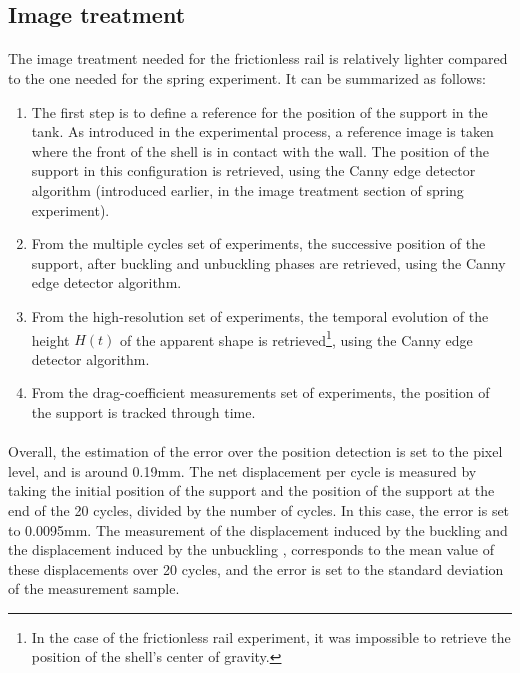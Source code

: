 \subsection{Image treatment}
\paragraph{}
The image treatment needed for the frictionless rail is relatively lighter compared to the one needed for the spring experiment. It can be summarized as follows:
\begin{enumerate}
	\item The first step is to define a reference for the position of the support in the tank. As introduced in the experimental process, a reference image is taken where the front of the shell is in contact with the wall. The position of the support in this configuration is retrieved, using the Canny edge detector algorithm (introduced earlier, in the image treatment section of spring experiment).
	
	\item From the multiple cycles set of experiments, the successive position of the support, after buckling and unbuckling phases are retrieved, using the Canny edge detector algorithm.
	
	\item From the high-resolution set of experiments, the temporal evolution of the height $H(t)$ of the apparent shape is retrieved\footnote{In the case of the frictionless rail experiment, it was impossible to retrieve the position of the shell's center of gravity.}, using the Canny edge detector algorithm.
	\item From the drag-coefficient measurements set of experiments, the position of the support is tracked through time.
\end{enumerate}
\paragraph{}
Overall, the estimation of the error over the position detection is set to the pixel level, and is around 0.19mm. The net displacement per cycle is measured by taking the initial position of the support and the position of the support at the end of the 20 cycles, divided by the number of cycles. In this case, the error is set to 0.0095mm. The measurement of the displacement induced by the buckling and the displacement induced by the unbuckling , corresponds to the mean value of these displacements over 20 cycles, and the error is set to the standard deviation of the measurement sample.
 